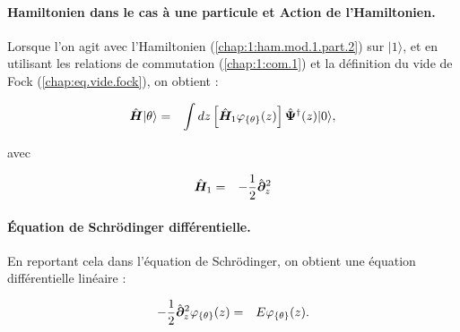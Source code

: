 \paragraph{Hamiltonien dans le cas à une particule et Action de l’Hamiltonien. }

Lorsque l’on agit avec l’Hamiltonien (\ref{chap:1:ham.mod.1.part.2}) sur \(\vert 1 \rangle\), et en utilisant les relations de commutation (\ref{chap:1:com.1}) et la définition du vide de Fock (\ref{chap:eq.vide.fock}), on obtient : 

\begin{eqnarray}
	\hat{\bm{H}}\vert \theta \rangle & = & \int dz \left [\hat{\bm{H}}_1  \varphi_{\{\theta\}}(z)  \right ] \hat{\bm{\Psi}}^\dag (z)	 \vert 0 \rangle,	
\end{eqnarray}

avec 

\begin{eqnarray*}
		\hat{\bm{H}}_1 & = & - \frac{1}{2} \hat{\bm{\partial}}_z^2
\end{eqnarray*}


\paragraph{Équation de Schrödinger différentielle.}

En reportant cela dans l’équation de Schrödinger, on obtient une équation différentielle linéaire :

\begin{eqnarray}
	- \frac{1}{2} \hat{\bm{\partial}}_z^2 \varphi_{\{\theta\}}(z) & = & E \varphi_{\{\theta\}}(z). \label{chap:eq.onebody.schrod}
\end{eqnarray}





